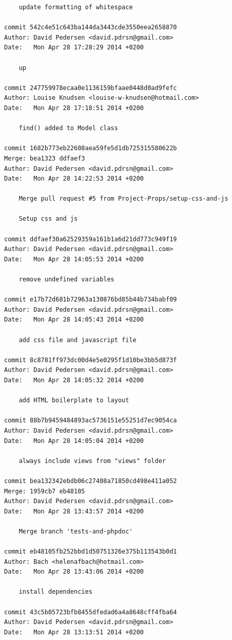 \documentclass[12pt]{article}
\begin{document}
\begin{verbatim}
    update formatting of whitespace

commit 542c4e51c643ba144da3443cde3550eea2658870
Author: David Pedersen <david.pdrsn@gmail.com>
Date:   Mon Apr 28 17:28:29 2014 +0200

    up

commit 247759978ecaa0e1136159bfaae0448d0ad9fefc
Author: Louise Knudsen <louise-w-knudsen@hotmail.com>
Date:   Mon Apr 28 17:18:51 2014 +0200

    find() added to Model class

commit 1682b773eb22608aea59fe5d1db725315580622b
Merge: bea1323 ddfaef3
Author: David Pedersen <david.pdrsn@gmail.com>
Date:   Mon Apr 28 14:22:53 2014 +0200

    Merge pull request #5 from Project-Props/setup-css-and-js
    
    Setup css and js

commit ddfaef30a62529359a161b1a6d21dd773c949f19
Author: David Pedersen <david.pdrsn@gmail.com>
Date:   Mon Apr 28 14:05:53 2014 +0200

    remove undefined variables

commit e17b72d681b72963a130876bd85b44b734babf09
Author: David Pedersen <david.pdrsn@gmail.com>
Date:   Mon Apr 28 14:05:43 2014 +0200

    add css file and javascript file

commit 8c8781ff973dc00d4e5e0295f1d10be3bb5d873f
Author: David Pedersen <david.pdrsn@gmail.com>
Date:   Mon Apr 28 14:05:32 2014 +0200

    add HTML boilerplate to layout

commit 88b7b9459484893ac5736151e55251d7ec9054ca
Author: David Pedersen <david.pdrsn@gmail.com>
Date:   Mon Apr 28 14:05:04 2014 +0200

    always include views from "views" folder

commit bea132342ebdb06c27408a71850cd498e411a052
Merge: 1959cb7 eb48105
Author: David Pedersen <david.pdrsn@gmail.com>
Date:   Mon Apr 28 13:43:57 2014 +0200

    Merge branch 'tests-and-phpdoc'

commit eb48105fb252bbd1d50751326e375b113543b0d1
Author: Bach <helenafbach@hotmail.com>
Date:   Mon Apr 28 13:43:06 2014 +0200

    install dependencies

commit 43c5b05723bfb8455dfedad6a4a8648cff4fba64
Author: David Pedersen <david.pdrsn@gmail.com>
Date:   Mon Apr 28 13:13:51 2014 +0200


\end{verbatim}
\end{document}
